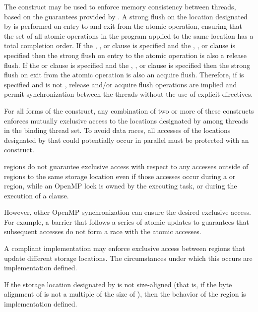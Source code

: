 The  construct may be used to enforce memory consistency between
threads, based on the guarantees provided by .  A strong flush on the location designated by 
is performed on entry to and exit from the atomic operation, ensuring that the
set of all atomic operations in the program applied to the same location has a
total completion order.  If the , , or 
clause is specified and the , , or
 clause is specified then the strong flush on entry to the
atomic operation is also a release flush.  If the  or  clause
is specified and the , , or 
clause is specified then the strong flush on exit from the atomic operation
is also an acquire flush.  Therefore, if  is specified and is not
, release and/or acquire flush operations are implied and permit
synchronization between the threads without the use of explicit 
directives.

For all forms of the  construct, any combination of two or more
of these  constructs enforces mutually exclusive access to the
locations designated by  among threads in the binding thread set.  To
avoid data races, all accesses of the locations designated by 
that could potentially occur in parallel must be protected with an
 construct.

 regions do not guarantee exclusive access with respect to any accesses outside
of  regions to the same storage location  even if those accesses occur during a
 or  region, while an OpenMP lock is owned by the executing
task, or during the execution of a  clause.

However, other OpenMP synchronization can ensure the desired exclusive access. For
example, a barrier that follows a series of atomic updates to  guarantees 
that subsequent accesses do not form a race with the atomic accesses.

A compliant implementation may enforce exclusive access between  regions
that update different storage locations. The circumstances under which this occurs are
implementation defined.

If the storage location designated by  is not size-aligned (that is, if the byte alignment
of  is not a multiple of the size of ), then the behavior of the  region is
implementation defined.

